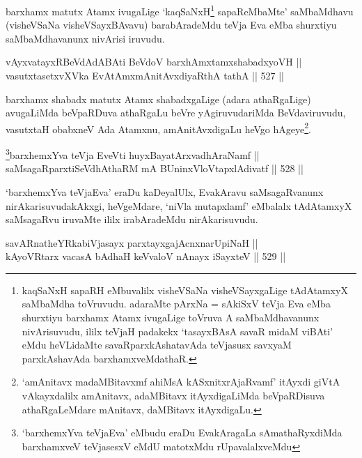 \begin{artha}
barxhamx matutx Atamx ivugaLige `kaqSaNxH\footnote{kaqSaNxH sapaRH
eMbuvalilx visheVSaNa visheVSayxgaLige tAdAtamxyX saMbaMdha toVruvudu.
adaraMte pArxNa = sAkiSxV teVja Eva eMba shurxtiyu barxhamx Atamx
ivugaLige toVruva A saMbaMdhavanunx nivArisuvudu, ililx teVjaH padakekx
`tasayxBAsA savaR midaM viBAti' eMdu heVLidaMte savaRparxkAshatavAda
teVjasusx savxyaM parxkAshavAda barxhamxveMdathaR.} sapaReMbaMte'
saMbaMdhavu (visheVSaNa visheVSayxBAvavu) barabAradeMdu teVja Eva eMba
shurxtiyu saMbaMdhavanunx nivArisi iruvudu.
\end{artha}


\begin{shl}
vAyxvatayxRBeVdAdABAti BeVdoV barxhAmxtamxshabadxyoVH ||  \\
vasutxtasetxvXVka EvA\s \s tAmx\s mAnitAvxdiyaRthA tathA \hfill || 527 ||  
\end{shl}

\begin{artha}
barxhamx shabadx matutx Atamx shabadxgaLige (adara athaRgaLige)
avugaLiMda beVpaRDuva athaRgaLu beVre yAgiruvudariMda BeVdaviruvudu,
vasutxtaH obabxneV Ada Atamxnu, amAnitAvxdigaLu heVgo
hAgeye\footnote{`amAnitavx madaMBitavxmf ahiMsA kASxnitxrAjaRvamf'
itAyxdi giVtA vAkayxdalilx amAnitavx, adaMBitavx itAyxdigaLiMda
beVpaRDisuva athaRgaLeMdare mAnitavx, daMBitavx itAyxdigaLu.}.
\end{artha}


\begin{shl}
\footnote{`barxhemxYva teVjaEva' eMbudu eraDu EvakAragaLa
sAmathaRyxdiMda barxhamxveV teVjasesxV eMdU matotxMdu rUpavalalxveMdu}barxhemxYva teVja EveVti huyxBayatArxvadhAraNamf ||  \\
saMsagaRparxtiSeVdhAthaRM mA BUninxVloVtapxlAdivatf \hfill || 528 ||  
\end{shl}

\begin{artha}
`barxhemxYva teVjaEva' eraDu kaDeyalUlx, EvakAravu
saMsagaRvanunx nirAkarisuvudakAkxgi, heVgeMdare, `niVla mutapxlamf'
eMbalalx tAdAtamxyX saMsagaRvu iruvaMte ililx irabAradeMdu
nirAkarisuvudu.
\end{artha}


\begin{shl}
savARnatheYRkabiVjasayx parxtayxgajAcnxnarUpiNaH || \\
kAyoVR\s tarx vacasA bAdhaH keVvaloV nAnayx iSayxteV \hfill || 529 ||  
\end{shl}


